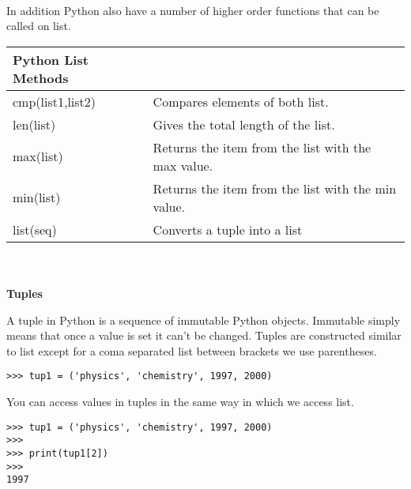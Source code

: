 \documentclass[letterpaper,11pt]{article}
\begin{document}
\\
\par{In addition Python also have a number of higher order functions that can be
called on list.}
\\
\begin{tabular}[t]{l l}
    \textbf{Python List Methods}  \\
    \hline
    cmp(list1,list2) & Compares elements of both list.                    \\
    len(list)        & Gives the total length of the list.                \\
    max(list)        & Returns the item from the list with the max value. \\
    min(list)        & Returns the item from the list with the min value. \\
    list(seq)        & Converts a tuple into a list                       \\
\end{tabular}
\\ \\
\textbf{Tuples}
\par{A tuple in Python is a sequence of immutable Python objects. Immutable
simply means that once a value is set it can't be changed. Tuples are
constructed similar to list except for a coma separated list between brackets we
use parentheses.}
\\
\begin{minipage}{.5\textwidth}
    \begin{tcolorbox}
        \begin{footnotesize}
            \begin{verbatim}
>>> tup1 = ('physics', 'chemistry', 1997, 2000)
            \end{verbatim}
        \end{footnotesize}
    \end{tcolorbox}
\end{minipage}
\par{You can access values in tuples in the same way in which we access list.}
\\
\begin{minipage}{.5\textwidth}
    \begin{tcolorbox}
        \begin{footnotesize}
            \begin{verbatim}
>>> tup1 = ('physics', 'chemistry', 1997, 2000)
>>>
>>> print(tup1[2])
>>>
1997
            \end{verbatim}
        \end{footnotesize}
    \end{tcolorbox}
\end{minipage}
\end{document}

